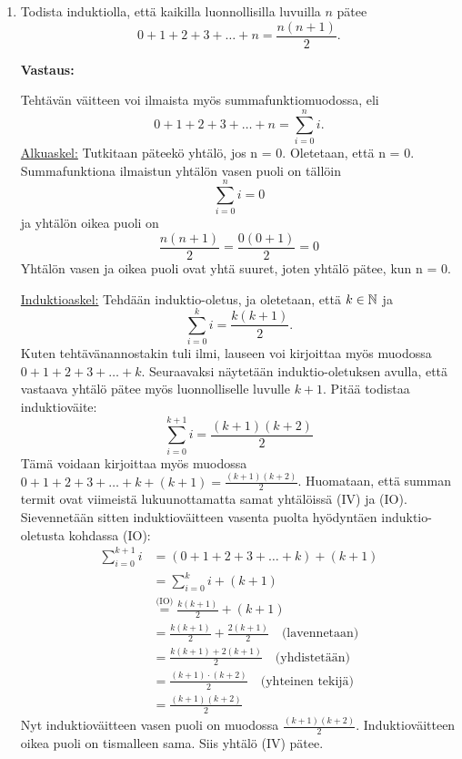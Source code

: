 \documentclass[a4paper,12pt]{article}
\begin{document}
\begin{enumerate}
\underline{Johtopäätös:} Alkuaskeleesta ja induktioaskeleesta seuraa induktioperiaatteen nojalla, että kaikilla $n \in \N$ pätee yhtälö
\begin{equation*}
    \sum_{i=0}^n i(i+1)=\frac{n(n+1)(n+2)}{3}.
\end{equation*} \vspace{0.5cm}

\item Todista induktiolla, ett\"a kaikilla luonnollisilla luvuilla $n$ p\"atee
$$0+1+2+3+ \ldots + n=\frac{n(n+1)}{2}.$$

\textbf{Vastaus:}

Tehtävän väitteen voi ilmaista myös summafunktiomuodossa, eli
\begin{equation*}
    0+1+2+3+ \ldots + n=\sum_{i=0}^ni.
\end{equation*}
\underline{Alkuaskel:} Tutkitaan päteekö yhtälö, jos n = 0. Oletetaan, että n = 0. Summafunktiona ilmaistun yhtälön vasen puoli on tällöin
\begin{equation*}
    \sum_{i=0}^ni=0
\end{equation*}
ja yhtälön oikea puoli on
\begin{equation*}
    \frac{n(n+1)}{2}=\frac{0(0+1)}{2}=0
\end{equation*}
Yhtälön vasen ja oikea puoli ovat yhtä suuret, joten yhtälö pätee, kun n = 0. 

\underline{Induktioaskel:} Tehdään induktio-oletus, ja oletetaan, että $k\in \mathbb{N}$ ja 
\begin{equation*}
    \sum_{i=0}^ki=\frac{k(k+1)}{2}. \tag{IO}
\end{equation*}
Kuten tehtävänannostakin tuli ilmi, lauseen voi kirjoittaa myös muodossa $0+1+2+3+ \ldots + k$. Seuraavaksi näytetään induktio-oletuksen avulla, että vastaava yhtälö pätee myös luonnolliselle luvulle $k+1$. Pitää todistaa induktioväite:
\begin{equation*}
    \sum_{i=0}^{k+1}i=\frac{(k+1)(k+2)}{2} \tag{IV}
\end{equation*}
Tämä voidaan kirjoittaa myös muodossa $0+1+2+3+\dots +k+(k+1)=\frac{(k+1)(k+2)}{2}$. Huomataan, että summan termit ovat viimeistä lukuunottamatta samat yhtälöissä (IV) ja (IO). Sievennetään sitten induktioväitteen vasenta puolta hyödyntäen induktio-oletusta kohdassa (IO):
\begin{align*}
    \sum_{i=0}^{k+1}i & = (0+1+2+3+\dots +k)+(k+1) \\
    & =\sum_{i=0}^ki+(k+1) \\
    & \stackrel{\text{(IO)}}{=}\frac{k(k+1)}{2}+(k+1) \\
    & = \frac{k(k+1)}{2}+\frac{2(k+1)}{2} \quad\text{(lavennetaan)} \\
    & = \frac{k(k+1)+2(k+1)}{2} \quad\text{(yhdistetään)} \\
    & = \frac{(k+1)\cdot(k+2)}{2} \quad\text{(yhteinen tekijä)} \\
    & = \frac{(k+1)(k+2)}{2}
\end{align*}
Nyt induktioväitteen vasen puoli on muodossa $\frac{(k+1)(k+2)}{2}$. Induktioväitteen oikea puoli on tismalleen sama. Siis yhtälö (IV) pätee.


\end{enumerate}
\end{document}

